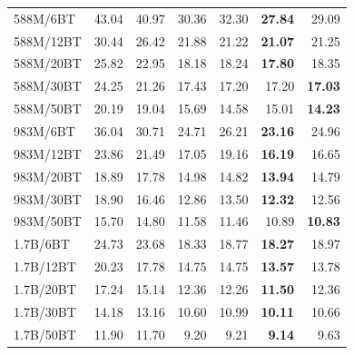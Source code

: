 \begin{table}[t]
{\begin{tabular}{lrrrrrr}
    \midrule
    588M/6BT & 43.04 & 40.97 & 30.36 & 32.30 & \textbf{27.84} & 29.09 \\
    588M/12BT & 30.44 & 26.42 & 21.88 & 21.22 & \textbf{21.07} & 21.25 \\
    588M/20BT & 25.82 & 22.95 & 18.18 & 18.24 & \textbf{17.80} & 18.35 \\
    588M/30BT & 24.25 & 21.26 & 17.43 & 17.20 & 17.20 & \textbf{17.03} \\
    588M/50BT & 20.19 & 19.04 & 15.69 & 14.58 & 15.01 & \textbf{14.23} \\
    \midrule
    983M/6BT & 36.04 & 30.71 & 24.71 & 26.21 & \textbf{23.16} & 24.96 \\
    983M/12BT & 23.86 & 21.49 & 17.05 & 19.16 & \textbf{16.19} & 16.65 \\
    983M/20BT & 18.89 & 17.78 & 14.98 & 14.82 & \textbf{13.94} & 14.79 \\
    983M/30BT & 18.90 & 16.46 & 12.86 & 13.50 & \textbf{12.32} & 12.56 \\
    983M/50BT & 15.70 & 14.80 & 11.58 & 11.46 & 10.89 & \textbf{10.83} \\
    \midrule
    1.7B/6BT & 24.73 & 23.68 & 18.33 & 18.77 & \textbf{18.27} & 18.97 \\
    1.7B/12BT & 20.23 & 17.78 & 14.75 & 14.75 & \textbf{13.57} & 13.78 \\
    1.7B/20BT & 17.24 & 15.14 & 12.36 & 12.26 & \textbf{11.50} & 12.36 \\
    1.7B/30BT & 14.18 & 13.16 & 10.60 & 10.99 & \textbf{10.11} & 10.66 \\
    1.7B/50BT & 11.90 & 11.70 & 9.20 & 9.21 & \textbf{9.14} & 9.63 \\
    \bottomrule
  \end{tabular}%
  }
\end{table}
